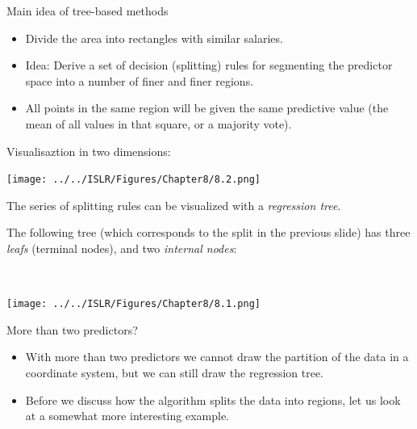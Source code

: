 \documentclass[10pt,ignorenonframetext,]{beamer}
\begin{document}
\begin{frame}

\begin{block}{Main idea of tree-based methods}

\vspace{2mm}

\begin{itemize}
\item
  Divide the area into rectangles with similar salaries.
\item
  Idea: Derive a set of decision (splitting) rules for segmenting the
  predictor space into a number of finer and finer regions.
\item
  All points in the same region will be given the same predictive value
  (the mean of all values in that square, or a majority vote).
\end{itemize}

Visualisaztion in two dimensions:

\centering
\texttt{[image: ../../ISLR/Figures/Chapter8/8.2.png]}

\end{block}

\end{frame}

\begin{frame}

The series of splitting rules can be visualized with a \emph{regression
tree}.

The following tree (which corresponds to the split in the previous
slide) has three \emph{leafs} (terminal nodes), and two \emph{internal
nodes}:

\(~\)

\centering

\texttt{[image: ../../ISLR/Figures/Chapter8/8.1.png]}

\end{frame}

\begin{frame}

\begin{block}{More than two predictors?}

\vspace{2mm}

\begin{itemize}
\item
  With more than two predictors we cannot draw the partition of the data
  in a coordinate system, but we can still draw the regression tree.
\item
  Before we discuss how the algorithm splits the data into regions, let
  us look at a somewhat more interesting example.
\end{itemize}

\end{block}

\end{frame}
\end{document}
